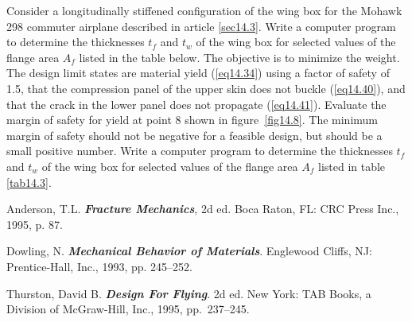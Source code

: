 \documentclass{AeroStructure-ERJohnson}
\begin{document}
Consider a longitudinally stiffened configuration of the wing box for the Mohawk 298 commuter airplane described in article \ref{sec14.3}. Write a computer program to determine the thicknesses $t_{f}$ and $t_{w}$ of the wing box for selected values of the flange area $A_{f}$ listed in the table below. The objective is to minimize the weight. The design limit states are material yield (\ref{eq14.34}) using a factor of safety of 1.5, that the compression panel of the upper skin does not buckle (\ref{eq14.40}), and that the crack in the lower panel does not propagate (\ref{eq14.41}). Evaluate the margin of safety for yield at point 8 shown in figure~\ref{fig14.8}. The minimum margin of safety should not be negative for a feasible design, but should be a small positive number. Write a computer program to determine the thicknesses $t_{f}$ and $t_{w}$ of the wing box for selected values of the flange area $A_{f}$ listed in table \ref{tab14.3}.

\begin{table}[h]
\end{table}

\vspace*{-15pt}

\begin{thebibliography}{}\label{sec14.4}
\bibitem{}
Anderson, T.L. \textit{\textbf{Fracture Mechanics}}, 2d ed. Boca Raton, FL: CRC Press Inc., 1995, p. 87.

\bibitem{}
Dowling, N. \textit{\textbf{Mechanical Behavior of Materials}}. Englewood Cliffs, NJ: Prentice-Hall, Inc., 1993, pp. 245--252.

\bibitem{}
Thurston, David B. \textbf{\textit{Design For Flying}}. 2d ed. New York: TAB Books, a Division of McGraw-Hill, Inc., 1995, pp.~237--245.
\end{thebibliography}
\end{document}
